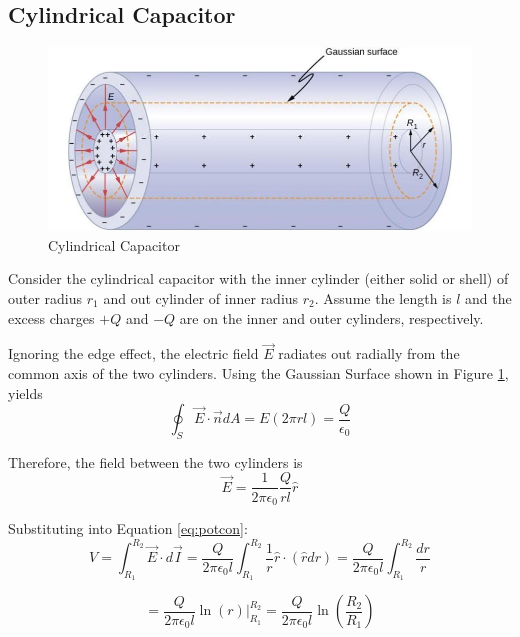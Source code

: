 \documentclass[14pt]{memoir}
\begin{document}
\subsection{Cylindrical Capacitor}

\begin{figure}[H]
\begin{center}
\includegraphics[scale=0.50]{fig/fig_08_07.jpg}
\caption{Cylindrical Capacitor}
\label{fig:08_07}
\end{center}
\end{figure}

Consider the cylindrical capacitor with the inner cylinder (either solid or shell) of outer radius $r_1$ and out cylinder of inner radius $r_2$. Assume the length is $l$ and the excess charges $+Q$ and $-Q$ are on the inner and outer cylinders, respectively.

Ignoring the edge effect, the electric field $\vec{E}$ radiates out radially from the common axis of the two cylinders. Using the Gaussian Surface shown in Figure \ref{fig:08_07}, yields
\begin{equation}
\oint_S \vec{E} \cdot \vec{n} dA = E(2 \pi r l) = \frac{Q}{\epsilon_0}
\end{equation} 

Therefore, the field between the two cylinders is
\begin{equation}
\vec{E} = \frac{1}{2 \pi \epsilon_0} \frac{Q}{r l} \hat{r}
\end{equation}

Substituting into Equation \ref{eq:potcon}:
\begin{equation}
V = \int_{R_1}^{R_2} \vec{E} \cdot d\vec{I} = \frac{Q}{2 \pi \epsilon_0 l} \int_{R_1}^{R_2} \frac{1}{r} \hat{r} \cdot (\hat{r} dr) = \frac{Q}{2 \pi \epsilon_0 l} \int_{R_1}^{R_2} \frac{dr}{r} 
\end{equation}

\begin{equation}
= \frac{Q}{2 \pi \epsilon_0 l} \ln{(r)}\bigg\rvert_{R_1}^{R_2} =  \frac{Q}{2 \pi \epsilon_0 l}  \ln{(\frac{R_2}{R_1})}
\end{equation}
\end{document}
